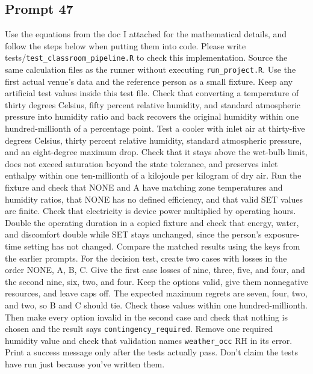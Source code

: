\subsection*{Prompt 47}
Use the equations from the doc I attached for the mathematical details, and follow the steps below when putting them into code. Please write tests/\nolinkurl{test_classroom_pipeline.R} to check this implementation. Source the same calculation files as the runner without executing \nolinkurl{run_project.R}. Use the first actual venue’s data and the reference person as a small fixture. Keep any artificial test values inside this test file.
Check that converting a temperature of thirty degrees Celsius, fifty percent relative humidity, and standard atmospheric pressure into humidity ratio and back recovers the original humidity within one hundred-millionth of a percentage point.
Test a cooler with inlet air at thirty-five degrees Celsius, thirty percent relative humidity, standard atmospheric pressure, and an eight-degree maximum drop. Check that it stays above the wet-bulb limit, does not exceed saturation beyond the state tolerance, and preserves inlet enthalpy within one ten-millionth of a kilojoule per kilogram of dry air.
Run the fixture and check that NONE and A have matching zone temperatures and humidity ratios, that NONE has no defined efficiency, and that valid SET values are finite. Check that electricity is device power multiplied by operating hours. Double the operating duration in a copied fixture and check that energy, water, and discomfort double while SET stays unchanged, since the person’s exposure-time setting has not changed. Compare the matched results using the keys from the earlier prompts.
For the decision test, create two cases with losses in the order NONE, A, B, C. Give the first case losses of nine, three, five, and four, and the second nine, six, two, and four. Keep the options valid, give them nonnegative resources, and leave caps off. The expected maximum regrets are seven, four, two, and two, so B and C should tie. Check those values within one hundred-millionth. Then make every option invalid in the second case and check that nothing is chosen and the result says \nolinkurl{contingency_required}.
Remove one required humidity value and check that validation names \nolinkurl{weather_occ} RH in its error. Print a success message only after the tests actually pass. Don’t claim the tests have run just because you’ve written them.

